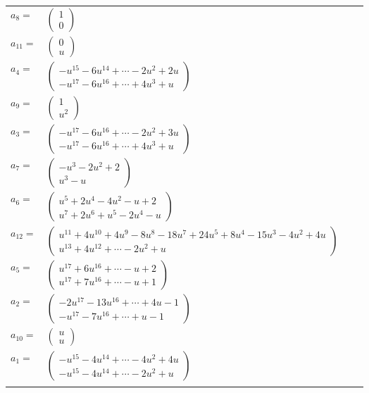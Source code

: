 \documentclass[1p]{elsarticle_modified}
\theoremstyle{definition}
\begin{document}
\begin{tabular}{m{7pt} m{180pt} m{7pt} m{180pt} }
\flushright $a_{8}=$&$\begin{pmatrix}1\\0\end{pmatrix}$ \\
\flushright $a_{11}=$&$\begin{pmatrix}0\\u\end{pmatrix}$ \\
\flushright $a_{4}=$&$\begin{pmatrix}- u^{15}-6 u^{14}+\cdots-2 u^2+2 u\\- u^{17}-6 u^{16}+\cdots+4 u^3+u\end{pmatrix}$ \\
\flushright $a_{9}=$&$\begin{pmatrix}1\\u^2\end{pmatrix}$ \\
\flushright $a_{3}=$&$\begin{pmatrix}- u^{17}-6 u^{16}+\cdots-2 u^2+3 u\\- u^{17}-6 u^{16}+\cdots+4 u^3+u\end{pmatrix}$ \\
\flushright $a_{7}=$&$\begin{pmatrix}- u^3-2 u^2+2\\u^3- u\end{pmatrix}$ \\
\flushright $a_{6}=$&$\begin{pmatrix}u^5+2 u^4-4 u^2- u+2\\u^7+2 u^6+u^5-2 u^4- u\end{pmatrix}$ \\
\flushright $a_{12}=$&$\begin{pmatrix}u^{11}+4 u^{10}+4 u^9-8 u^8-18 u^7+24 u^5+8 u^4-15 u^3-4 u^2+4 u\\u^{13}+4 u^{12}+\cdots-2 u^2+u\end{pmatrix}$ \\
\flushright $a_{5}=$&$\begin{pmatrix}u^{17}+6 u^{16}+\cdots- u+2\\u^{17}+7 u^{16}+\cdots- u+1\end{pmatrix}$ \\
\flushright $a_{2}=$&$\begin{pmatrix}-2 u^{17}-13 u^{16}+\cdots+4 u-1\\- u^{17}-7 u^{16}+\cdots+u-1\end{pmatrix}$ \\
\flushright $a_{10}=$&$\begin{pmatrix}u\\u\end{pmatrix}$ \\
\flushright $a_{1}=$&$\begin{pmatrix}- u^{15}-4 u^{14}+\cdots-4 u^2+4 u\\- u^{15}-4 u^{14}+\cdots-2 u^2+u\end{pmatrix}$\\&\end{tabular}
\end{document}
